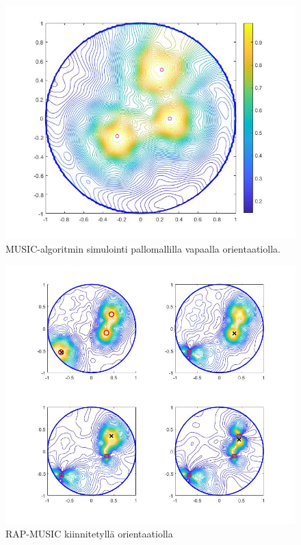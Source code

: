 \begin{figure}[h]
    \centering
    \includegraphics[scale=0.4]{mfree.jpg}
    \caption{MUSIC-algoritmin simulointi pallomallilla vapaalla orientaatiolla.}
    \label{fig:mfree}
\end{figure}

\clearpage

\begin{figure}[ht]
    \centering
    \includegraphics[width=\textwidth]{RAPfixed.jpg}
    \caption{RAP-MUSIC kiinnitetyllä orientaatiolla}
    \label{fig:RAPfix}
\end{figure}

